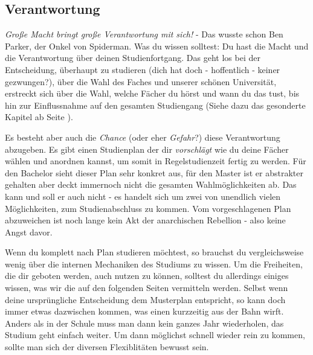 \begin{multicols}{2}
\subsection{Verantwortung}
	\textit{Große Macht bringt große Verantwortung mit sich!} - Das wusste schon Ben Parker, der Onkel von Spiderman. Was du wissen solltest: Du hast die Macht und die Verantwortung über deinen Studienfortgang. Das geht los bei der Entscheidung, überhaupt zu studieren (dich hat doch - hoffentlich - keiner gezwungen?), über die Wahl des Faches und unserer schönen Universität, erstreckt sich über die Wahl, welche Fächer du hörst und wann du das tust, bis hin zur Einflussnahme auf den gesamten Studiengang (Siehe dazu das gesonderte Kapitel ab Seite \pageref{politik}).

	Es besteht aber auch die \textit{Chance} (oder eher \textit{Gefahr}?) diese Verantwortung abzugeben. Es gibt einen Studienplan der dir \textit{vorschlägt} wie du deine Fächer wählen und anordnen kannst, um somit in Regelstudienzeit fertig zu werden. Für den Bachelor sieht dieser Plan sehr konkret aus, für den Master ist er abstrakter gehalten aber deckt immernoch nicht die gesamten Wahlmöglichkeiten ab. Das kann und soll er auch nicht - es handelt sich um zwei von unendlich vielen Möglichkeiten, zum Studienabschluss zu kommen. Vom vorgeschlagenen Plan abzuweichen ist noch lange kein Akt der anarchischen Rebellion - also keine Angst davor.

	Wenn du komplett nach Plan studieren möchtest, so brauchst du vergleichsweise wenig über die internen Mechaniken des Studiums zu wissen. Um die Freiheiten, die dir geboten werden, auch nutzen zu können, solltest du allerdings einiges wissen, was wir die auf den folgenden Seiten vermitteln werden. Selbst wenn deine ursprüngliche Entscheidung dem Musterplan entspricht, so kann doch immer etwas dazwischen kommen, was einen kurzzeitig aus der Bahn wirft. Anders als in der Schule muss man dann kein ganzes Jahr wiederholen, das Studium geht einfach weiter. Um dann möglichst schnell wieder rein zu kommen, sollte man sich der diversen Flexiblitäten bewusst sein.
\end{multicols}